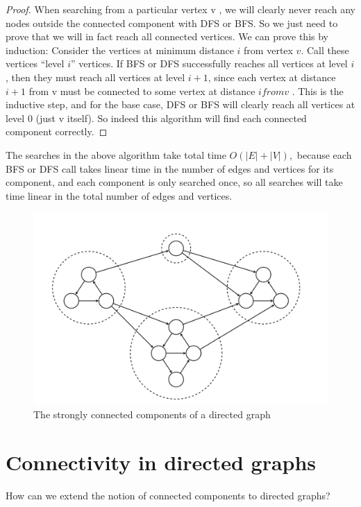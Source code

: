 \documentclass [12pt]{article}
\theoremstyle{definition}
\begin{document}
\begin{proof}
When searching from a particular vertex v , we will clearly never reach any nodes outside the connected component with DFS or BFS. So we just need to prove that we will in fact reach all connected vertices. We can prove this by induction: Consider the vertices at minimum distance $i$ from vertex $v$. Call these vertices ``level $i$'' vertices. If BFS or DFS successfully reaches all vertices at level $i$, then they must reach all vertices at level $i + 1$, since each vertex at distance $i + 1$ from v must be connected to some vertex at distance $i from v$ . This is the inductive step, and for the base case, DFS or BFS will clearly reach all vertices at level $0$ (just v itself). So indeed this algorithm will find each connected component correctly.
\end{proof}

The searches in the above algorithm take total time $O(|E| + |V |),$ because each BFS or DFS call takes linear time in the number of edges and vertices for its component, and each component is only searched once, so all searches will take time linear in the total number of edges and vertices.

\begin{figure}[h!]
\centering
\includegraphics[scale=0.5]{scc_graph.png}
\caption{The strongly connected components of a directed graph}
\label{fig:scc_graph}
\end{figure}

\section{Connectivity in directed graphs}
How can we extend the notion of connected components to directed graphs?
\end{document}
